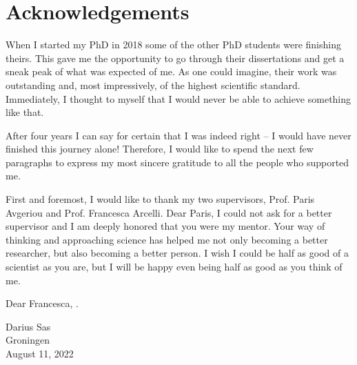 \chapter*{Acknowledgements}

When I started my PhD in 2018 some of the other PhD students were finishing theirs.
This gave me the opportunity to go through their dissertations and get a sneak peak of what was expected of me.
As one could imagine, their work was outstanding and, most impressively, of the highest scientific standard.
Immediately, I thought to myself that I would never be able to achieve something like that.

After four years I can say for certain that I was indeed right -- I would have never finished this journey alone!
Therefore, I would like to spend the next few paragraphs to express my most sincere gratitude to all the people who supported me.

First and foremost, I would like to thank my two supervisors, Prof. Paris Avgeriou and Prof. Francesca Arcelli.
Dear Paris, I could not ask for a better supervisor and I am deeply honored that you were my mentor. Your way of thinking and approaching science has helped me not only becoming a better researcher, but also becoming a better person. 
I wish I could be half as good of a scientist as you are, but I will be happy even being half as good as you think of me.

Dear Francesca, .



\begin{flushright}
    Darius Sas\\
    Groningen\\
    August 11, 2022
\end{flushright}